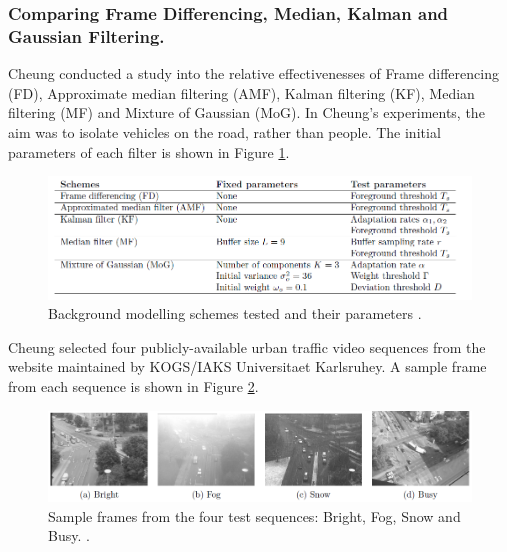 \subsubsection{Comparing Frame Differencing, Median, Kalman and Gaussian Filtering.}
Cheung \cite{Cheung2007} conducted a study into the relative effectivenesses of Frame differencing (FD), Approximate median filtering (AMF), Kalman filtering (KF), Median filtering (MF) and Mixture of Gaussian (MoG). In Cheung's experiments, the aim was to isolate vehicles on the road, rather than people. The initial parameters of each filter is shown in Figure \ref{fig:background modelling schemes tested and their parameters}.\\

\begin{figure}[h]
\begin{center}
\includegraphics[scale=0.4]{./research/schemes} 
\end{center}
\caption{Background modelling schemes tested and their parameters \cite{Cheung2007}.}
\label{fig:background modelling schemes tested and their parameters}
\end{figure}

Cheung \cite{Cheung2007} selected four publicly-available urban traffic video sequences from the website maintained by KOGS/IAKS Universitaet Karlsruhey. A sample frame from each sequence is shown in Figure \ref{fig:sample frames from the four test sequences: Bright, Fog, Snow and Busy}.\\ 

\begin{figure}[h]
\begin{center}
\includegraphics[scale=0.4]{./research/samples} 
\end{center}
\caption{Sample frames from the four test sequences: Bright, Fog, Snow and Busy. \cite{Cheung2007}.}
\label{fig:sample frames from the four test sequences: Bright, Fog, Snow and Busy}
\end{figure}

